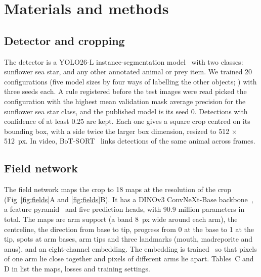 \section*{Materials and methods}

\subsection*{Detector and cropping}

The detector is a YOLO26-L instance-segmentation model~\cite{jocher2026ultralytics} with two classes: sunflower sea star, and any other annotated animal or prey item.
We trained 20 configurations (five model sizes by four ways of labelling the other objects; ) with three seeds each.
A rule registered before the test images were read picked the configuration with the highest mean validation mask average precision for the sunflower sea star class, and the published model is its seed 0.
Detections with confidence of at least 0.25 are kept.
Each one gives a square crop centred on its bounding box, with a side twice the larger box dimension, resized to 512 $\times$ 512~px.
In video, BoT-SORT~\cite{aharon2022botsort} links detections of the same animal across frames.

\subsection*{Field network}

The field network maps the crop to 18 maps at the resolution of the crop (Fig~\ref{fig:fields}A and \ref{fig:fields}B).
It has a DINOv3 ConvNeXt-Base backbone~\cite{simeoni2025dinov3,liu2022convnet}, a feature pyramid~\cite{lin2017feature} and five prediction heads, with 90.9 million parameters in total.
The maps are arm support (a band 8~px wide around each arm), the centreline, the direction from base to tip, progress from 0 at the base to 1 at the tip, spots at arm bases, arm tips and three landmarks (mouth, madreporite and anus), and an eight-channel embedding.
The embedding is trained~\cite{debrabandere2017semantic} so that pixels of one arm lie close together and pixels of different arms lie apart.
Tables~C and D in  list the maps, losses and training settings.

